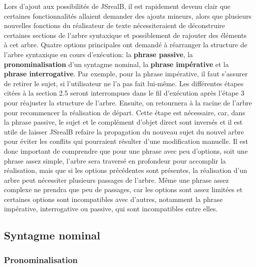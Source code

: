 \documentclass[11pt]{article} %
\begin{document}
Lors d'ajout aux possibilités de JSrealB, il est rapidement devenu
clair que certaines fonctionnalités allaient demander des ajouts mineurs,
alors que plusieurs nouvelles fonctions du réalisateur de texte nécessiteraient
de déconstruire certaines sections de l'arbre syntaxique et possiblement
de rajouter des éléments à cet arbre. Quatre options principales ont
demandé à réarranger la structure de l'arbre syntaxique en cours d'exécution:
la \textbf{phrase passive}, la \textbf{pronominalisation} d'un syntagme
nominal, la \textbf{phrase impérative} et la \textbf{phrase interrogative}.
Par exemple, pour la phrase impérative, il faut s'assurer de retirer
le sujet, si l'utilisateur ne l'a pas fait lui-même. Les différentes
étapes citées à la section 2.5 seront interrompues dans le fil d'exécution
après l'étape 3 pour réajuster la structure de l'arbre. Ensuite, on
retournera à la racine de l'arbre pour recommencer la réalisation
de départ. Cette étape est nécessaire, car, dans la phrase passive,
le sujet et le complément d'objet direct sont inversés et il est utile
de laisser JSrealB refaire la propagation du nouveau sujet du nouvel
arbre pour éviter les conflits qui pourraient résulter d'une modification
manuelle. Il est donc important de comprendre que pour une phrase
avec peu d'options, soit une phrase assez simple, l'arbre sera traversé
en profondeur pour accomplir la réalisation, mais que si les options
précédentes sont présentes, la réalisation d'un arbre peut nécessiter
plusieurs passages de l'arbre. Même une phrase assez complexe
ne prendra que peu de passages, car les options sont assez limitées
et certaines options sont incompatibles avec d'autres, notamment la
phrase impérative, interrogative ou passive, qui sont incompatibles
entre elles.

\subsection{Syntagme nominal}

\subsubsection{Pronominalisation}
\label{pronomi}
\end{document}
